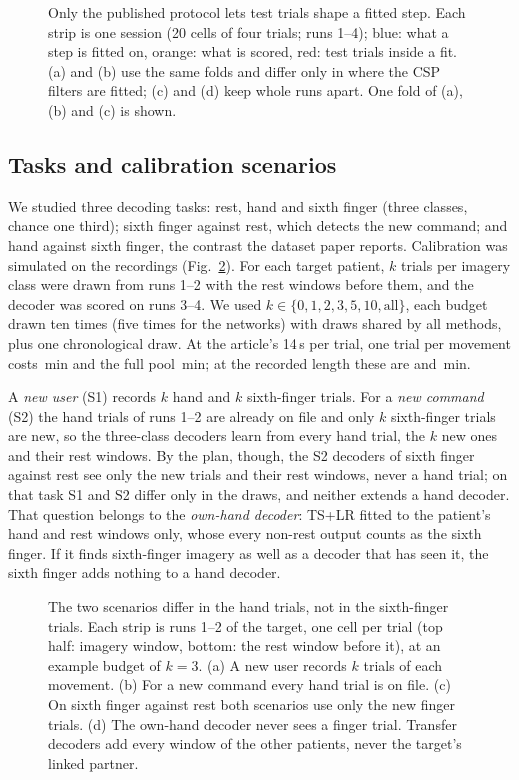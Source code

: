 \begin{figure}[!t]
  \centering
  
  \caption{Only the published protocol lets test trials shape a fitted step. Each strip is one
  session (20 cells of four trials; runs 1--4); blue: what a step is fitted on, orange: what is
  scored, red: test trials inside a fit. (a) and (b) use the same folds and differ only in where
  the CSP filters are fitted; (c) and (d) keep whole runs apart. One fold of (a), (b) and (c) is
  shown.}
  \label{fig:protocols}
\end{figure}

\subsection{Tasks and calibration scenarios}
\label{sec:scenarios}
We studied three decoding tasks: rest, hand and sixth finger (three classes, chance one third);
sixth finger against rest, which detects the new command; and hand against sixth finger, the
contrast the dataset paper reports. Calibration was simulated on the recordings
(Fig.~\ref{fig:calib}). For each target patient, $k$ trials per imagery class were drawn from
runs 1--2 with the rest windows before them, and the decoder was scored on runs 3--4. We used
$k \in \{0, 1, 2, 3, 5, 10, \text{all}\}$, each budget drawn ten times (five times for the
networks) with draws shared by all methods, plus one chronological draw. At the article's 14\,s
per trial, one trial per movement costs \rqTwoMinutesKOne\,min and the full pool
\rqTwoMinutesKAll\,min; at the recorded length these are \rqTwoMinutesRecordedKOne{} and
\rqTwoMinutesRecordedKAll\,min.

A \emph{new user} (S1) records $k$ hand and $k$ sixth-finger trials. For a \emph{new command}
(S2) the hand trials of runs 1--2 are already on file and only $k$ sixth-finger trials are new,
so the three-class decoders learn from every hand trial, the $k$ new ones and their rest windows.
By the plan, though, the S2 decoders of sixth finger against rest see only the new trials and
their rest windows, never a hand trial; on that task S1 and S2 differ only in the draws, and
neither extends a hand decoder. That question belongs to the \emph{own-hand decoder}: TS+LR
fitted to the patient's hand and rest windows only, whose every non-rest output counts as the
sixth finger. If it finds sixth-finger imagery as well as a decoder that has seen it, the sixth
finger adds nothing to a hand decoder.

\begin{figure}[!t]
  \centering
  
  \caption{The two scenarios differ in the hand trials, not in the sixth-finger trials. Each
  strip is runs 1--2 of the target, one cell per trial (top half: imagery window, bottom: the
  rest window before it), at an example budget of $k = 3$. (a) A new user records $k$ trials of
  each movement. (b) For a new command every hand trial is on file. (c) On sixth finger against
  rest both scenarios use only the new finger trials. (d) The own-hand decoder never sees a
  finger trial. Transfer decoders add every window of the other patients, never the target's
  linked partner.}
  \label{fig:calib}
\end{figure}


